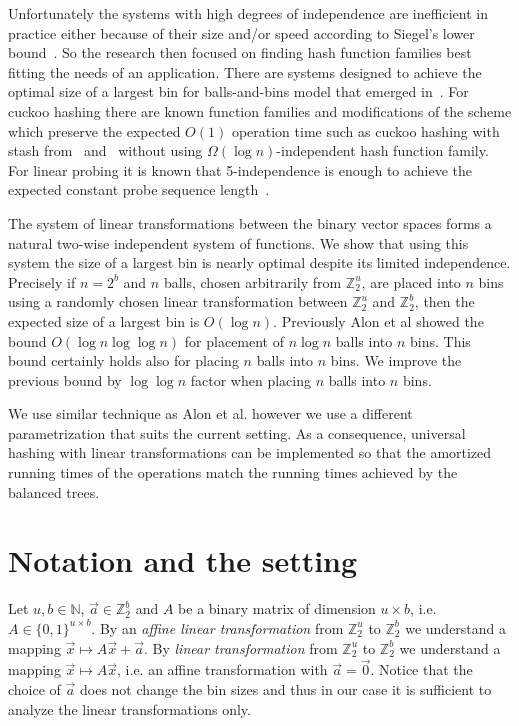 ﻿\documentclass[review]{elsarticle}
\newcommand{\vecspace}[2]{\mathbb{Z}_{#1}^{#2}}
\newcommand{\binvecspace}[1]{\vecspace{2}{#1}}
\begin{document}
Unfortunately the systems with high degrees of independence are inefficient in practice either because of their size and/or speed according to Siegel's lower bound~\cite{siegel}. 
So the research then focused on finding hash function families best fitting the needs of an application. 
There are systems designed to achieve the optimal size of a largest bin for balls-and-bins model that emerged in~\cite{celisetal}.
For cuckoo hashing there are known function families and modifications of the scheme which preserve the expected $O(1)$ operation time such as cuckoo hashing with stash from~\cite{mitzenmacher-cuckoo} and~\cite{dietzfelbinger-cuckoo} without using $\Omega(\log n)$-independent hash function family.
For linear probing it is known that 5-independence is enough to achieve the expected constant probe sequence length~\cite{linear-probing}.

The system of linear transformations between the binary vector spaces forms a natural two-wise independent system of functions.
We show that using this system the size of a largest bin is nearly optimal despite its limited independence.
 Precisely if $n = 2^b$ and $n$ balls, chosen arbitrarily from $\binvecspace{u}$, are placed into $n$ bins using a randomly chosen linear transformation between $\binvecspace{u}$ and $\binvecspace{b}$, then the expected size of a largest bin is $O(\log n)$.
Previously Alon et al \cite{alonetal} showed the bound $O(\log n \log \log n)$ for placement of $n \log n$ balls into $n$ bins.
This bound certainly holds also for placing $n$ balls into $n$ bins.
We improve the previous bound by $\log \log n$ factor when placing $n$ balls into $n$ bins.

We use similar technique as Alon et al. however we use a different parametrization that suits the current setting. 
As a consequence, universal hashing with linear transformations can be implemented so that the amortized running times of the operations match the running times achieved by the balanced trees.

\section{Notation and the setting}
Let $u, b \in \mathbb{N}$, $\vec{a} \in \binvecspace{b}$ and $A$ be a binary matrix of dimension $u \times b$, i.e. $A \in \{0, 1\}^{u \times b}$.
By an \emph{affine linear transformation} from $\binvecspace{u}$ to $\binvecspace{b}$ we understand a mapping $\vec x \mapsto A\vec x + \vec{a}$.
By \emph{linear transformation} from $\binvecspace{u}$ to $\binvecspace{b}$
we understand a mapping $\vec x \mapsto A\vec x$, i.e. an affine transformation with $\vec{a} = \vec{0}$.
Notice that the choice of $\vec{a}$ does not change the bin sizes and thus in our case it is sufficient to analyze the linear transformations only.
\end{document}
